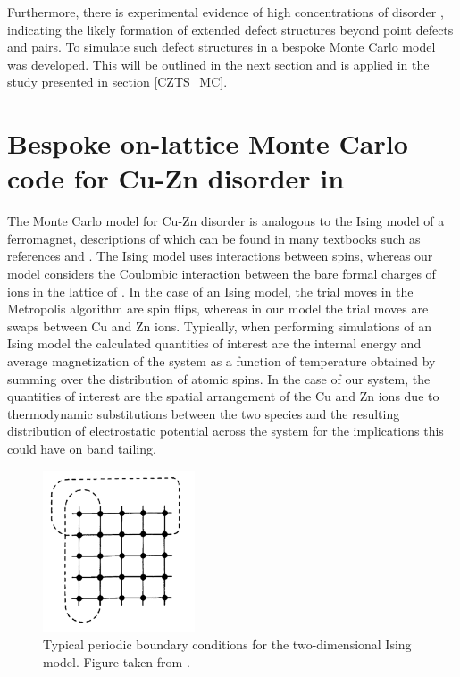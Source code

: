\documentclass[11pt, twoside]{report}
\begin{document}
Furthermore, there is experimental evidence of high concentrations of disorder \cite{Scragg, pot_fluc_4, neutron, Schorr}, indicating the likely formation of extended defect structures beyond point defects and pairs. To simulate such defect structures in {\CZTS} a bespoke Monte Carlo model was developed. This will be outlined in the next section and is applied in the study presented in section \ref{CZTS_MC}.


\section{Bespoke on-lattice Monte Carlo code for Cu-Zn disorder in {\CZTS}}\label{Eris}
The Monte Carlo model for Cu-Zn disorder is analogous to the Ising model of a ferromagnet, descriptions of which can be found in many textbooks such as references  and . 
The Ising model uses interactions between spins, whereas our model considers the Coulombic interaction between the bare formal charges of ions in the lattice of {\CZTS}.
In the case of an Ising model, the trial moves in the Metropolis algorithm are spin flips, whereas in our model the trial moves are swaps between Cu and Zn ions. Typically, when performing simulations of an Ising model the calculated quantities of interest are the internal energy and average magnetization of the system as a function of temperature obtained by summing over the distribution of atomic spins. In the case of our system, the quantities of interest are the spatial arrangement of the Cu and Zn ions due to thermodynamic substitutions between the two species and the resulting distribution of electrostatic potential across the system for the implications this could have on band tailing. 

\begin{figure}[h!]
  \centering
    \includegraphics[width=0.4\textwidth]{figures/MC_PBCs.png}
    \caption[Typical periodic boundary conditions for the two-dimensional Ising model.]{Typical periodic boundary conditions for the two-dimensional Ising model. Figure taken from .}
  \label{MC_PBCs}
\end{figure}
\end{document}
